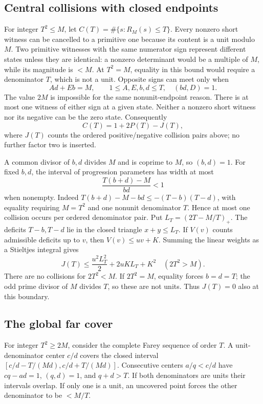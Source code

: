 \documentclass[11pt]{article}
\theoremstyle{definition}\newtheorem{definition}[theorem]{Definition}
\theoremstyle{remark}\newtheorem{remark}[theorem]{Remark}
\begin{document}
\subsection{Central collisions with closed endpoints}
\label{ap:central-collisions}
For integer \(T^2\leq M\), let \(C(T)=\#\{s:R_M(s)\leq T\}\).
Every nonzero short witness can be cancelled to a primitive one because its
content is a unit modulo \(M\).
Two primitive witnesses with the same numerator sign represent different
states unless they are identical: a nonzero determinant would be a multiple
of \(M\), while its magnitude is \(<M\). At \(T^2=M\), equality in this
bound would require a denominator \(T\), which is not a unit.
Opposite signs can meet only when
\[
 Ad+Eb=M,\qquad 1\leq A,E,b,d\leq T,\quad (bd,D)=1.
\]
The value \(2M\) is impossible for the same nonunit-endpoint reason.
There is at most one witness of either sign at a given state.
Neither a nonzero short witness nor its negative can be the zero state.
Consequently
\begin{equation}
 C(T)=1+2P(T)-J(T),
 \label{ap:central-cdf}
\end{equation}
where \(J(T)\) counts the ordered positive/negative collision pairs above;
no further factor two is inserted.

A common divisor of \(b,d\) divides \(M\) and is coprime to \(M\), so
\((b,d)=1\). For fixed \(b,d\), the interval of progression parameters has
width at most
\[
 \frac{T(b+d)-M}{bd}<1
\]
when nonempty. Indeed
\(T(b+d)-M-bd\leq-(T-b)(T-d)\), with equality requiring \(M=T^2\)
and one nonunit denominator \(T\).
Hence at most one collision occurs per ordered denominator pair.
Put \(L_T=(2T-M/T)_+\). The deficits \(T-b,T-d\) lie in the closed triangle
\(x+y\leq L_T\).
If \(V(v)\) counts admissible deficits up to \(v\), then \(V(v)\leq uv+K\).
Summing the linear weights as a Stieltjes integral gives
\begin{equation}
 J(T)\leq \frac{u^2L_T^2}{2}+2uK L_T+K^2
 \quad(2T^2>M).
 \label{ap:collision-upper}
\end{equation}
There are no collisions for \(2T^2<M\). If \(2T^2=M\), equality forces
\(b=d=T\); the odd prime divisor of \(M\) divides \(T\), so these are
not units. Thus \(J(T)=0\) also at this boundary.

\subsection{The global far cover}
\label{ap:far-cover}
For integer \(T^2\geq2M\), consider the complete Farey sequence of order \(T\).
A unit-denominator center \(c/d\) covers the closed interval
\([c/d-T/(Md),c/d+T/(Md)]\).
Consecutive centers \(a/q<c/d\) have \(cq-ad=1\), \((q,d)=1\), and \(q+d>T\).
If both denominators are units their intervals overlap.
If only one is a unit, an uncovered point forces the other denominator to
be \(<M/T\).
\end{document}
